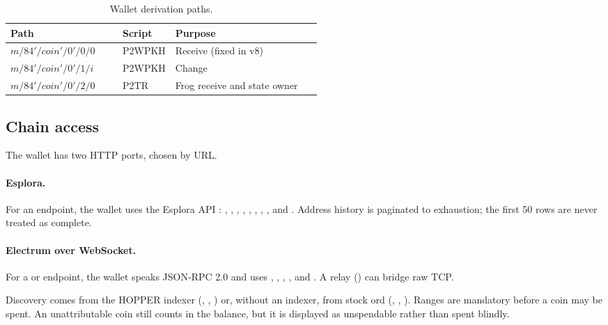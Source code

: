 \begin{table}[htbp]
\centering
\small
\caption{Wallet derivation paths.}
\label{tab:derivation}
\begin{tabularx}{\linewidth}{@{}p{0.36\linewidth}p{0.16\linewidth}X@{}}
\toprule
\textbf{Path} & \textbf{Script} & \textbf{Purpose} \\
\midrule
$m/84'/\mathit{coin}'/0'/0/0$ & P2WPKH & Receive (fixed in v8) \\
$m/84'/\mathit{coin}'/0'/1/i$ & P2WPKH & Change \\
$m/84'/\mathit{coin}'/0'/2/0$ & P2TR & Frog receive and state owner \\
\bottomrule
\end{tabularx}
\end{table}

\subsection{Chain access}

The wallet has two HTTP ports, chosen by URL.

\paragraph{Esplora.} For an  endpoint, the wallet uses the Esplora API \cite{esplora}:
, ,
, ,
, ,
, , and .
Address history is paginated to exhaustion; the first 50 rows are never
treated as complete.

\paragraph{Electrum over WebSocket.} For a  or 
endpoint, the wallet speaks JSON-RPC 2.0 and uses
, ,
, , and
. A relay () can
bridge raw TCP.

Discovery comes from the HOPPER indexer
(, , ) or,
without an indexer, from stock ord (,
, ). Ranges are mandatory before a
coin may be spent. An unattributable coin still counts in the balance, but it
is displayed as unspendable rather than spent blindly.

